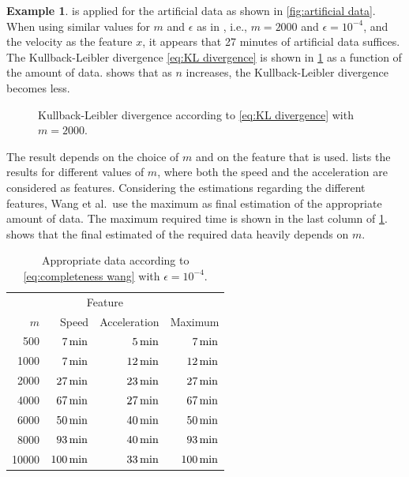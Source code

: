 \documentclass[10pt,final,a4paper,oneside,onecolumn]{article}
\newlength\figurewidth
\newlength\figureheight
\newcommand*{\etal}{et al.}                                     %
\theoremstyle{plain}\newtheorem{definition}{Definition}[section]    %
\theoremstyle{definition}\newtheorem{example}{Example}[section]     %
\theoremstyle{remark}\newtheorem{remarkenv}{Remark}[section]        %
\newcommand{\otoprule}{\midrule[\heavyrulewidth]}
\begin{document}
\begin{example}
	 is applied for the artificial data as shown in \cref{fig:artificial data}. When using similar values for $m$ and $\epsilon$ as in \cite{wang2017much}, i.e., $m=2000$ and $\epsilon=10^{-4}$, and the velocity as the feature $x$, it appears that 27 minutes of artificial data suffices. The Kullback-Leibler divergence \cref{eq:KL divergence} is shown in \cref{fig:kl sample based} as a function of the amount of data.  shows that as $n$ increases, the Kullback-Leibler divergence becomes less. 
	
	\setlength{}
	\setlength\figureheight{0.7\figurewidth}
	\begin{figure}
		\centering
		\caption{Kullback-Leibler divergence according to \cref{eq:KL divergence} with $m=2000$.}
		\label{fig:kl sample based}
	\end{figure}
	
	The result depends on the choice of $m$ and on the feature that is used.  lists the results for different values of $m$, where both the speed and the acceleration are considered as features. Considering the estimations regarding the different features, Wang \etal\ use the maximum as final estimation of the appropriate amount of data. The maximum required time is shown in the last column of \cref{tab:wang result}.  shows that the final estimated of the required data heavily depends on $m$.
		
	\begin{table}
		\centering
		\caption{Appropriate data according to \cref{eq:completeness wang} with $\epsilon=10^{-4}$.}
		\label{tab:wang result}
		\begin{tabular}{rrrr}
			\toprule
			& \multicolumn{2}{c}{Feature} & \\
			$m$ & Speed & Acceleration & Maximum \\ \otoprule
			500 & $\unit[7]{min}$ & $\unit[5]{min}$ & $\unit[7]{min}$ \\
			1000 & $\unit[7]{min}$ & $\unit[12]{min}$ & $\unit[12]{min}$ \\
			2000 & $\unit[27]{min}$ & $\unit[23]{min}$ & $\unit[27]{min}$ \\
			4000 & $\unit[67]{min}$ & $\unit[27]{min}$ & $\unit[67]{min}$ \\
			6000 & $\unit[50]{min}$ & $\unit[40]{min}$ & $\unit[50]{min}$ \\
			8000 & $\unit[93]{min}$ & $\unit[40]{min}$ & $\unit[93]{min}$ \\
			10000 & $\unit[100]{min}$ & $\unit[33]{min}$ & $\unit[100]{min}$ \\
			\bottomrule
		\end{tabular}
	\end{table}
\end{example}
\end{document}

